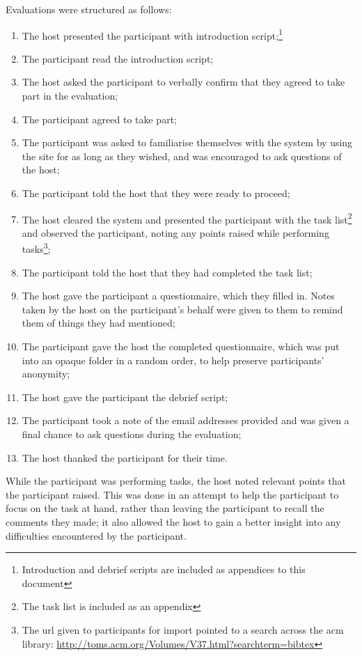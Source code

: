 Evaluations were structured as follows:
\begin{enumerate}
	\item The host presented the participant with introduction script;\footnote{Introduction and debrief scripts are included as appendices to this document}
	\item The participant read the introduction script;
	\item The host asked the participant to verbally confirm that they agreed to take part in the evaluation;
	\item The participant agreed to take part;
	\item The participant was asked to familiarise themselves with the system by using the site for as long as they wished, and was encouraged to ask questions of the host;
	\item The participant told the host that they were ready to proceed;
	\item The host cleared the system and presented the participant with the task list\footnote{The task list is included as an appendix} and observed the participant, noting any points raised while performing tasks\footnote{The \gls{url} given to participants for import pointed to a search across the \gls{acm} library: \url{http://toms.acm.org/Volumes/V37.html?searchterm=bibtex}};
	\item The participant told the host that they had completed the task list;
	\item The host gave the participant a questionnaire, which they filled in. Notes taken by the host on the participant's behalf were given to them to remind them of things they had mentioned;
	\item The participant gave the host the completed questionnaire, which was put into an opaque folder in a random order, to help preserve participants' anonymity;
	\item The host gave the participant the debrief script;
	\item The participant took a note of the email addresses provided and was given a final chance to ask questions during the evaluation;
	\item The host thanked the participant for their time.
\end{enumerate}

While the participant was performing tasks, the host noted relevant points that the participant raised.  This was done in an attempt to help the participant to focus on the task at hand, rather than leaving the participant to recall the comments they made; it also allowed the host to gain a better insight into any difficulties encountered by the participant.

